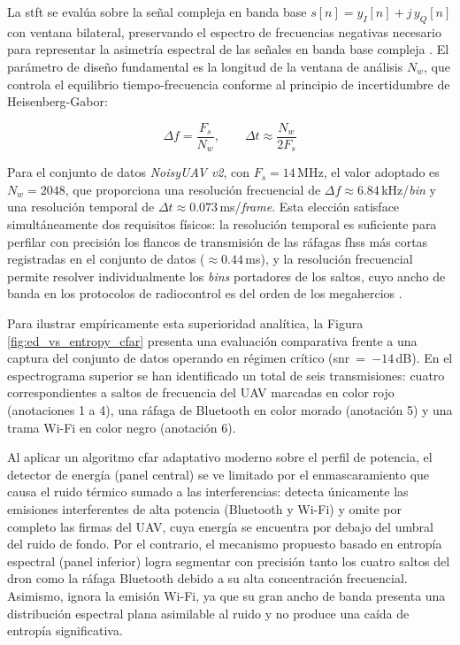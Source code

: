 La \gls{stft} se evalúa sobre la señal compleja en banda base $s[n] = y_I[n] + j\,y_Q[n]$ con ventana bilateral, preservando el espectro de frecuencias negativas necesario para representar la asimetría espectral de las señales en banda base compleja \cite{oppenheim_discrete_2014}. El parámetro de diseño fundamental es la longitud de la ventana de análisis $N_w$, que controla el equilibrio tiempo-frecuencia conforme al principio de incertidumbre de Heisenberg-Gabor:

\begin{equation}
    \Delta f = \frac{F_s}{N_w}, \qquad \Delta t \approx \frac{N_w}{2 F_s}
    \label{eq:resolucion_stft}
\end{equation}

Para el conjunto de datos \textit{NoisyUAV v2}, con $F_s = 14$\,MHz, el valor adoptado es $N_w = 2048$, que proporciona una resolución frecuencial de $\Delta f \approx 6.84$\,kHz/\textit{bin} y una resolución temporal de $\Delta t \approx 0.073$\,ms/\textit{frame}. Esta elección satisface simultáneamente dos requisitos físicos: la resolución temporal es suficiente para perfilar con precisión los flancos de transmisión de las ráfagas \gls{fhss} más cortas registradas en el conjunto de datos ($\approx 0.44$\,ms), y la resolución frecuencial permite resolver individualmente los \textit{bins} portadores de los saltos, cuyo ancho de banda en los protocolos de radiocontrol es del orden de los megahercios \cite{morge-rollet_drone_2022}.

\vspace{\baselineskip}

Para ilustrar empíricamente esta superioridad analítica, la Figura \ref{fig:ed_vs_entropy_cfar} presenta una evaluación comparativa frente a una captura del conjunto de datos operando en régimen crítico (\gls{snr}~=~$-14$\,dB). En el espectrograma superior se han identificado un total de seis transmisiones: cuatro correspondientes a saltos de frecuencia del UAV marcadas en color rojo (anotaciones 1 a 4), una ráfaga de Bluetooth en color morado (anotación 5) y una trama Wi-Fi en color negro (anotación 6). 

Al aplicar un algoritmo \gls{cfar} adaptativo moderno sobre el perfil de potencia, el detector de energía (panel central) se ve limitado por el enmascaramiento que causa el ruido térmico sumado a las interferencias: detecta únicamente las emisiones interferentes de alta potencia (Bluetooth y Wi-Fi) y omite por completo las firmas del UAV, cuya energía se encuentra por debajo del umbral del ruido de fondo. Por el contrario, el mecanismo propuesto basado en entropía espectral (panel inferior) logra segmentar con precisión tanto los cuatro saltos del dron como la ráfaga Bluetooth debido a su alta concentración frecuencial. Asimismo, ignora la emisión Wi-Fi, ya que su gran ancho de banda presenta una distribución espectral plana asimilable al ruido y no produce una caída de entropía significativa.


